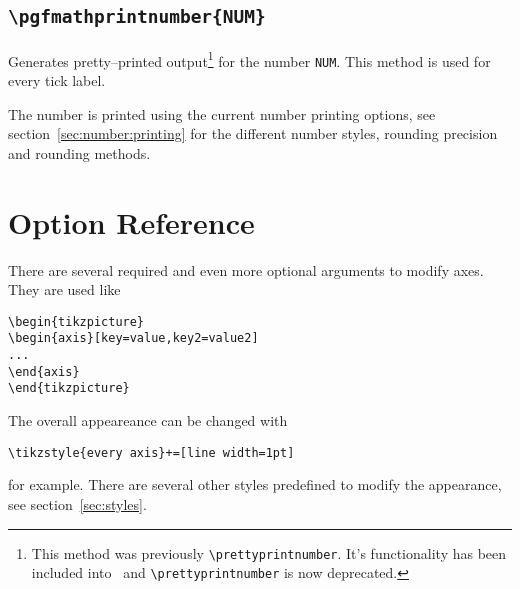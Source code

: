\subsection{\texttt{\textbackslash pgfmathprintnumber\{NUM\}}}
Generates pretty--printed output\footnote{This method was previously \texttt{\textbackslash prettyprintnumber}. It's functionality has been included into \PGF\ and \texttt{\textbackslash prettyprintnumber} is now deprecated.} for the number \texttt{NUM}. This method is used for every tick label.

The number is printed using the current number printing options, see section~\ref{sec:number:printing} for the different number styles, rounding precision and rounding methods.

% 
\section{Option Reference}
There are several required and even more optional arguments to modify axes. They are used like
\begin{lstlisting}
\begin{tikzpicture}
\begin{axis}[key=value,key2=value2]
...
\end{axis}
\end{tikzpicture}
\end{lstlisting}
The overall appeareance can be changed with
\begin{lstlisting}
\tikzstyle{every axis}+=[line width=1pt]
\end{lstlisting}
for example. There are several other styles predefined to modify the appearance, see section~\ref{sec:styles}.


